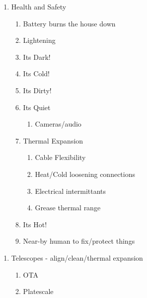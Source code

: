 \documentclass[letter,11pt,oneside]{article}
\begin{document}
\begin{enumerate}\addtolength{\itemsep}{-0.5\baselineskip}
\setcounter{enumi}{1}
   \item   Health and Safety
\vspace{-.15cm}
\begin{enumerate}\addtolength{\itemsep}{-0.5\baselineskip}
   \item   Battery burns the house down
   \item   Lightening
   \item   Its Dark!
   \item   Its Cold!
   \item   Its Dirty!
   \item   Its Quiet
\vspace{-.15cm}
\begin{enumerate}\addtolength{\itemsep}{-0.5\baselineskip}
   \item   Cameras/audio
\end{enumerate}

   \item   Thermal Expansion
\vspace{-.15cm}
\begin{enumerate}\addtolength{\itemsep}{-0.5\baselineskip}
   \item   Cable Flexibility
   \item   Heat/Cold loosening connections
   \item   Electrical intermittants
   \item   Grease thermal range
\end{enumerate}

   \item   Its Hot!
   \item   Near-by human to fix/protect things
\end{enumerate}

\end{enumerate}

\vspace{-.15cm}
\begin{enumerate}\addtolength{\itemsep}{-0.5\baselineskip}
\setcounter{enumi}{2}
   \item   Telescopes - align/clean/thermal expansion
\vspace{-.15cm}
\begin{enumerate}\addtolength{\itemsep}{-0.5\baselineskip}
   \item   OTA
   \item   Platescale
\end{enumerate}
\end{enumerate}
\end{document}
